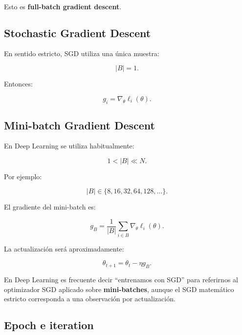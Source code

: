 \documentclass[
  letterpaper,
  DIV=11,
  numbers=noendperiod]{scrartcl}
\begin{document}
Esto es \textbf{full-batch gradient descent}.

\subsection{Stochastic Gradient
Descent}\label{stochastic-gradient-descent}

En sentido estricto, SGD utiliza una única muestra:

\[
|B|=1.
\]

Entonces:

\[
g_i
=
\nabla_\theta\ell_i(\theta).
\]

\subsection{Mini-batch Gradient
Descent}\label{mini-batch-gradient-descent}

En Deep Learning se utiliza habitualmente:

\[
1<|B|\ll N.
\]

Por ejemplo:

\[
|B|\in\{8,16,32,64,128,\ldots\}.
\]

El gradiente del mini-batch es:

\[
g_B
=
\frac1{|B|}
\sum_{i\in B}
\nabla_\theta\ell_i(\theta).
\]

La actualización será aproximadamente:

\[
\theta_{t+1}
=
\theta_t-\eta g_B.
\]

\begin{tcolorbox}[enhanced jigsaw, arc=.35mm, bottomrule=.15mm, bottomtitle=1mm, breakable, colback=white, colbacktitle=quarto-callout-note-color!10!white, colframe=quarto-callout-note-color-frame, coltitle=black, left=2mm, leftrule=.75mm, opacityback=0, opacitybacktitle=0.6, rightrule=.15mm, title=\textcolor{quarto-callout-note-color}{\faInfo}\hspace{0.5em}{Note}, titlerule=0mm, toprule=.15mm, toptitle=1mm]

En Deep Learning es frecuente decir ``entrenamos con SGD'' para
referirnos al optimizador SGD aplicado sobre \textbf{mini-batches},
aunque el SGD matemático estricto corresponda a una observación por
actualización.

\end{tcolorbox}

\subsection{Epoch e iteration}\label{epoch-e-iteration}
\end{document}
